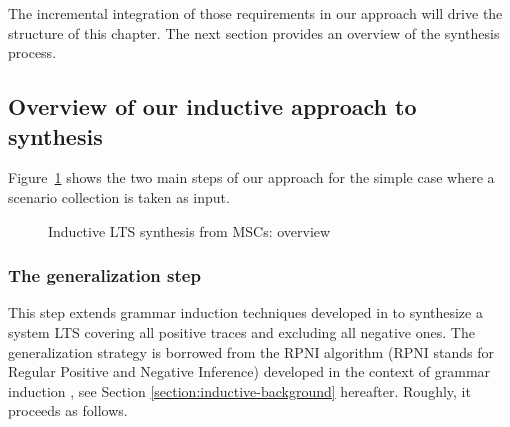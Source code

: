 The incremental integration of those requirements in our approach will drive the structure of this chapter. The next section provides an overview of the synthesis process.


\subsection{Overview of our inductive approach to synthesis\label{subsection:inductive-synthesis-approach}}

Figure~\ref{image:inductive-synthesis-overview} shows the two main steps of our approach for the simple case where a scenario collection is taken as input. 

\begin{figure}[h]
\centering
{}
\caption{Inductive LTS synthesis from MSCs: overview\label{image:inductive-synthesis-overview}}
\end{figure}

\subsubsection*{The generalization step}

This step extends grammar induction techniques developed in \cite{Oncina:1992} to synthesize a system LTS covering all positive traces and excluding all negative ones. The generalization strategy is borrowed from the RPNI algorithm (RPNI stands for Regular Positive and Negative Inference) developed in the context of grammar induction \cite{Oncina:1992}, see Section \ref{section:inductive-background} hereafter. Roughly, it proceeds as follows.

